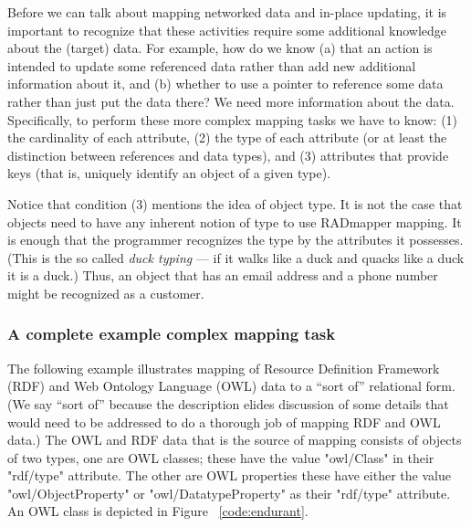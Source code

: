 \documentclass[9pt,letterpaper]{article}
\newcommand{\stt}[1]{\begin{footnotesize}\texttt{#1}\end{footnotesize}}
\begin{document}
Before we can talk about mapping networked data and in-place updating, it is important to recognize that these activities require
some additional knowledge about the (target) data.
For example, how do we know
(a) that an action is intended to update some referenced data rather than add new additional information about it, and
(b) whether to use a pointer to reference some data rather than just put the data there?
We need more information about the data.
Specifically, to perform these more complex mapping tasks we have to know:
(1) the cardinality of each attribute,
(2) the type of each attribute (or at least the distinction between references and data types), and
(3) attributes that provide keys (that is, uniquely identify an object of a given type).

Notice that condition (3) mentions the idea of object type.
It is not the case that objects need to have any inherent notion of type to use RADmapper mapping.
It is enough that the programmer recognizes the type by the attributes it possesses.
(This is the so called \textit{duck typing} --- if it walks like a duck and quacks like a duck it is a duck.)
Thus, an object that has an email address and a phone number might be recognized as a customer.

\subsubsection{A complete example complex mapping task}

The following example illustrates mapping of Resource Definition Framework (RDF) and Web Ontology Language (OWL) data to
a ``sort of'' relational form. (We say ``sort of'' because the description elides discussion of some details that would need
to be addressed to do a thorough job of mapping RDF and OWL data.)
The OWL and RDF data that is the source of mapping consists of objects of two types, one are OWL classes;
these have the value  "owl/Class" in their "rdf/type" attribute.
The other are OWL properties these have either the value "owl/ObjectProperty" or "owl/DatatypeProperty" as
their "rdf/type" attribute. An OWL class is depicted in Figure ~\ref{code:endurant}.
\end{document}
